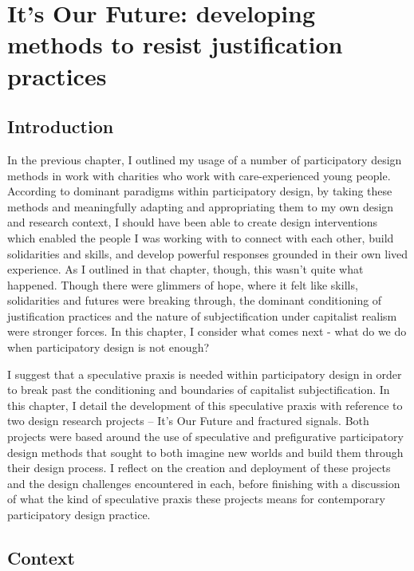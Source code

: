 \chapter{It's Our Future: developing methods to resist justification practices}
\label{}

\section{Introduction}
\label{}

In the previous chapter, I outlined my usage of a number of participatory design methods in work with charities who work with care-experienced young people. According to dominant paradigms within participatory design, by taking these methods and meaningfully adapting and appropriating them to my own design and research context, I should have been able to create design interventions which enabled the people I was working with to connect with each other, build solidarities and skills, and develop powerful responses grounded in their own lived experience. As I outlined in that chapter, though, this wasn’t quite what happened. Though there were glimmers of hope, where it felt like skills, solidarities and futures were breaking through, the dominant conditioning of justification practices and the nature of subjectification under capitalist realism were stronger forces. In this chapter, I consider what comes next - what do we do when participatory design is not enough? 

I suggest that a speculative praxis is needed within participatory design in order to break past the conditioning and boundaries of capitalist subjectification. In this chapter, I detail the development of this speculative praxis with reference to two design research projects – It’s Our Future and fractured signals. Both projects were based around the use of speculative and prefigurative participatory design methods that sought to both imagine new worlds and build them through their design process. I reflect on the creation and deployment of these projects and the design challenges encountered in each, before finishing with a discussion of what the kind of speculative praxis these projects means for contemporary participatory design practice.

\section{Context}

